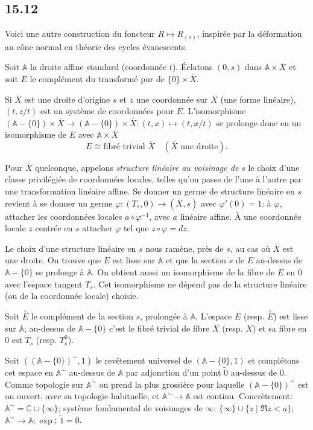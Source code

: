 \documentclass[12pt,a4paper]{article}
\theoremstyle{plain}
\theoremstyle{definition}
\theoremstyle{remark}
\newcommand{\bC}{\mathbb{C}}
\newcommand{\bA}{\mathbb{A}}
\begin{document}
\subsection*{15.12}

Voici une autre construction du foncteur $R \mapsto R_{(s)}$, inspirée par la déformation au cône normal en théorie des cycles évanescents.

Soit $\bA$ la droite affine standard (coordonnée $t$). Éclatons $(0, s)$ dans $\bA \times \overline{X}$ et soit $E$ le complément du transformé pur de $\{0\} \times \overline{X}$.

Si $\overline{X}$ est une droite d'origine $s$ et $z$ une coordonnée sur $\overline{X}$ (une forme linéaire), $(t, z/t)$ est un système de coordonnées pour $E$. L'isomorphisme $(\bA - \{0\}) \times \overline{X} \to (\bA - \{0\}) \times \overline{X}: (t, x) \mapsto (t, x/t)$ se prolonge donc en un isomorphisme de $E$ avec $\bA \times \overline{X}$
\begin{equation}\label{eq:15.12.1}
E \cong \text{fibré trivial } \overline{X} \quad (\overline{X} \text{ une droite}).
\end{equation}

Pour $\overline{X}$ quelconque, appelons \emph{structure linéaire au voisinage de $s$} le choix d'une classe privilégiée de coordonnées locales, telles qu'on passe de l'une à l'autre par une transformation linéaire affine. Se donner un germe de structure linéaire en $s$ revient à se donner un germe $\varphi : (T_s, 0) \to (\overline{X}, s)$ avec $\varphi'(0) = 1$: à $\varphi$, attacher les coordonnées locales $a \circ \varphi^{-1}$, avec $a$ linéaire affine. À une coordonnée locale $z$ centrée en $s$ attacher $\varphi$ tel que $z \circ \varphi = dz$.

Le choix d'une structure linéaire en $s$ nous ramène, près de $s$, au cas où $\overline{X}$ est une droite. On trouve que $E$ est lisse sur $\bA$ et que la section $s$ de $E$ au-dessus de $\bA - \{0\}$ se prolonge à $\bA$. On obtient aussi un isomorphisme de la fibre de $E$ en $0$ avec l'espace tangent $T_s$. Cet isomorphisme ne dépend pas de la structure linéaire (ou de la coordonnée locale) choisie.

Soit $\overset{\circ}{E}$ le complément de la section $s$, prolongée à $\bA$. L'espace $E$ (resp. $\overset{\circ}{E}$) est lisse sur $\bA$; au-dessus de $\bA - \{0\}$ c'est le fibré trivial de fibre $\overline{X}$ (resp. $X$) et sa fibre en $0$ est $T_s$ (resp. $T_s^0$).

Soit $((\bA - \{0\})^\sim, 1)$ le revêtement universel de $(\bA - \{0\}, 1)$ et complétons cet espace en $\bA^\sim$ au-dessus de $\bA$ par adjonction d'un point $\tilde{0}$ au-dessus de $0$. Comme topologie sur $\bA^\sim$ on prend la plus grossière pour laquelle $(\bA - \{0\})^\sim$ est un ouvert, avec sa topologie habituelle, et $\bA^\sim \to \bA$ est continu. Concrètement: $\bA^\sim = \bC \cup \{\infty\}$; système fondamental de voisinages de $\infty$: $\{\infty\} \cup \{z \mid \Re z < a\}$; $\bA^\sim \to \bA: \exp$; $\tilde{1} = 0$.
\end{document}
